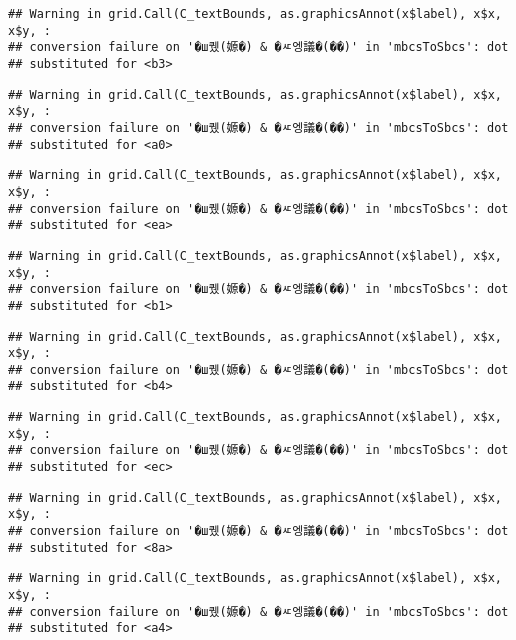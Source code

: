 \documentclass[
]{article}
\begin{document}
\begin{verbatim}
## Warning in grid.Call(C_textBounds, as.graphicsAnnot(x$label), x$x, x$y, :
## conversion failure on '�ш퀬(嫄�) & �ㅼ엥議�(��)' in 'mbcsToSbcs': dot
## substituted for <b3>
\end{verbatim}

\begin{verbatim}
## Warning in grid.Call(C_textBounds, as.graphicsAnnot(x$label), x$x, x$y, :
## conversion failure on '�ш퀬(嫄�) & �ㅼ엥議�(��)' in 'mbcsToSbcs': dot
## substituted for <a0>
\end{verbatim}

\begin{verbatim}
## Warning in grid.Call(C_textBounds, as.graphicsAnnot(x$label), x$x, x$y, :
## conversion failure on '�ш퀬(嫄�) & �ㅼ엥議�(��)' in 'mbcsToSbcs': dot
## substituted for <ea>
\end{verbatim}

\begin{verbatim}
## Warning in grid.Call(C_textBounds, as.graphicsAnnot(x$label), x$x, x$y, :
## conversion failure on '�ш퀬(嫄�) & �ㅼ엥議�(��)' in 'mbcsToSbcs': dot
## substituted for <b1>
\end{verbatim}

\begin{verbatim}
## Warning in grid.Call(C_textBounds, as.graphicsAnnot(x$label), x$x, x$y, :
## conversion failure on '�ш퀬(嫄�) & �ㅼ엥議�(��)' in 'mbcsToSbcs': dot
## substituted for <b4>
\end{verbatim}

\begin{verbatim}
## Warning in grid.Call(C_textBounds, as.graphicsAnnot(x$label), x$x, x$y, :
## conversion failure on '�ш퀬(嫄�) & �ㅼ엥議�(��)' in 'mbcsToSbcs': dot
## substituted for <ec>
\end{verbatim}

\begin{verbatim}
## Warning in grid.Call(C_textBounds, as.graphicsAnnot(x$label), x$x, x$y, :
## conversion failure on '�ш퀬(嫄�) & �ㅼ엥議�(��)' in 'mbcsToSbcs': dot
## substituted for <8a>
\end{verbatim}

\begin{verbatim}
## Warning in grid.Call(C_textBounds, as.graphicsAnnot(x$label), x$x, x$y, :
## conversion failure on '�ш퀬(嫄�) & �ㅼ엥議�(��)' in 'mbcsToSbcs': dot
## substituted for <a4>
\end{verbatim}
\end{document}

